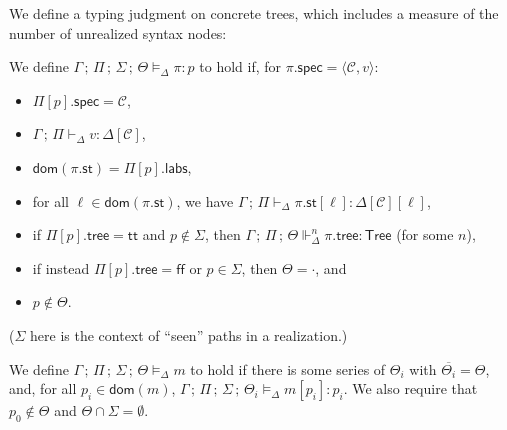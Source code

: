 \documentclass{article}
\newcommand{\num}[1]{\overline{#1}}
\newcommand{\mf}[1]{\mathsf{#1}}
\newcommand{\mc}[1]{\mathcal{#1}}
\newcommand{\semi}{\,;\,}
\newcommand{\dom}{\mf{dom}}
\newcommand{\pair}[2]{\langle #1, #2 \rangle}
\newcommand{\tval}[4]{#1 \semi #2 \vdash_\Delta #3 : #4}
\newcommand{\tstr}{\mf{String}}
\newcommand{\tattr}{\mf{Attr}}
\newcommand{\ttree}{\mf{Tree}}
\renewcommand{\tt}{\mf{tt}}
\newcommand{\ff}{\mf{ff}}
\newcommand{\C}{\mc{C}}
\newcommand{\elit}[1]{\mf{lit}\ #1}
\newcommand{\enode}[3]{\mf{node}(\mf{#1}, #2, #3)}
\begin{document}
We define a typing judgment on concrete trees,
which includes a measure of the number of unrealized syntax nodes:

We define $\Gamma \semi \Pi \semi \Sigma \semi \Theta \vDash_\Delta \pi: p$ 
to hold if,
for $\pi.\mf{spec}=\pair{\C}{v}$:
\begin{itemize}
\item $\Pi[p].\mf{spec}=\C$,
\item $\tval{\Gamma}{\Pi}{v}{\Delta[\C]}$,
\item $\dom(\pi.\mf{st}) = \Pi[p].\mf{labs}$,
\item for all $\ell \in \dom(\pi.\mf{st})$,
we have $\tval{\Gamma}{\Pi}{\pi.\mf{st}[\ell]}{\Delta[\C][\ell]}$,
\item if $\Pi[p].\mf{tree} = \tt$ and $p \notin \Sigma$, then
$\Gamma \semi \Pi \semi \Theta \Vdash^n_\Delta \pi.\mf{tree} : \ttree$
(for some $n$),
\item if instead $\Pi[p].\mf{tree} = \ff$ or $p \in \Sigma$, then $\Theta=\cdot$, and
\item $p \notin \Theta$.
\end{itemize}
($\Sigma$ here is the context of ``seen'' paths in a realization.)

We define $\Gamma \semi \Pi \semi \Sigma \semi \Theta \vDash_\Delta m$ 
to hold if
there is some series of $\Theta_i$ with $\num{\Theta_i}=\Theta$,
and, for all $p_i \in \dom(m)$,
$\Gamma \semi \Pi \semi \Sigma \semi \Theta_i \vDash_\Delta m[p_i]: p_i$.
We also require that $p_0 \notin \Theta$ and $\Theta \cap \Sigma = \emptyset$.
\end{document}
